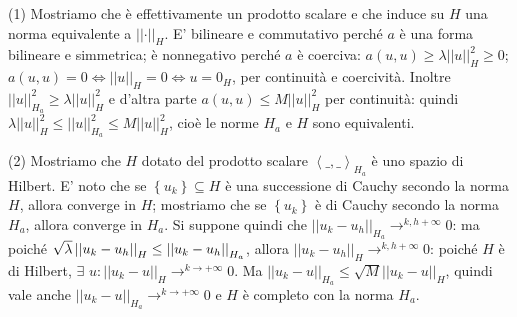 \documentclass{article}
\begin{document}
(1) Mostriamo che \`{e} effettivamente un prodotto scalare e che induce su $%
H $ una norma equivalente a $\left\vert \left\vert \cdot \right\vert
\right\vert _{H}$. E' bilineare e commutativo perch\'{e} $a$ \`{e} una forma
bilineare e simmetrica; \`{e} nonnegativo perch\'{e} $a$ \`{e} coerciva: $%
a\left( u,u\right) \geq \lambda \left\vert \left\vert u\right\vert
\right\vert _{H}^{2}\geq 0$; $a\left( u,u\right) =0\Longleftrightarrow
\left\vert \left\vert u\right\vert \right\vert _{H}=0\Longleftrightarrow
u=0_{H}$, per continuit\`{a} e coercivit\`{a}. Inoltre $\left\vert
\left\vert u\right\vert \right\vert _{H_{a}}^{2}\geq \lambda \left\vert
\left\vert u\right\vert \right\vert _{H}^{2}$ e d'altra parte $a\left(
u,u\right) \leq M\left\vert \left\vert u\right\vert \right\vert _{H}^{2}$
per continuit\`{a}: quindi $\lambda \left\vert \left\vert u\right\vert
\right\vert _{H}^{2}\leq \left\vert \left\vert u\right\vert \right\vert
_{H_{a}}^{2}\leq M\left\vert \left\vert u\right\vert \right\vert _{H}^{2}$,
cio\`{e} le norme $H_{a}$ e $H$ sono equivalenti.

(2) Mostriamo che $H$ dotato del prodotto scalare $\left\langle
\_,\_\right\rangle _{H_{a}}$ \`{e} uno spazio di Hilbert. E' noto che se $%
\left\{ u_{k}\right\} \subseteq H$ \`{e} una successione di Cauchy secondo
la norma $H$, allora converge in $H$; mostriamo che se $\left\{
u_{k}\right\} $ \`{e} di Cauchy secondo la norma $H_{a}$, allora converge in 
$H_{a}$. Si suppone quindi che $\left\vert \left\vert u_{k}-u_{h}\right\vert
\right\vert _{H_{a}}\rightarrow ^{k,h+\infty }0$: ma poich\'{e} $\sqrt{%
\lambda }\left\vert \left\vert u_{k}-u_{h}\right\vert \right\vert _{H}\leq
\left\vert \left\vert u_{k}-u_{h}\right\vert \right\vert _{H_{a}}$, allora $%
\left\vert \left\vert u_{k}-u_{h}\right\vert \right\vert _{H}\rightarrow
^{k,h+\infty }0$: poich\'{e} $H$ \`{e} di Hilbert, $\exists $ $u:\left\vert
\left\vert u_{k}-u\right\vert \right\vert _{H}\rightarrow ^{k\rightarrow
+\infty }0$. Ma $\left\vert \left\vert u_{k}-u\right\vert \right\vert
_{H_{a}}\leq \sqrt{M}\left\vert \left\vert u_{k}-u\right\vert \right\vert
_{H}$, quindi vale anche $\left\vert \left\vert u_{k}-u\right\vert
\right\vert _{H_{a}}\rightarrow ^{k\rightarrow +\infty }0$ e $H$ \`{e}
completo con la norma $H_{a}$.
\end{document}
